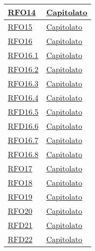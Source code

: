 \begin{longtable}{|>{\centering}m{5cm}|m{5cm}<{\centering}|}
\hyperlink{RFO14}{RFO14} & \hyperlink{Capitolato}{Capitolato}\\ \hline

\hyperlink{RFO15}{RFO15} & \hyperlink{Capitolato}{Capitolato}\\ \hline

\hyperlink{RFO16}{RFO16} & \hyperlink{Capitolato}{Capitolato}\\ \hline

\hyperlink{RFO16.1}{RFO16.1} & \hyperlink{Capitolato}{Capitolato}\\ \hline

\hyperlink{RFO16.2}{RFO16.2} & \hyperlink{Capitolato}{Capitolato}\\ \hline

\hyperlink{RFO16.3}{RFO16.3} & \hyperlink{Capitolato}{Capitolato}\\ \hline

\hyperlink{RFO16.4}{RFO16.4} & \hyperlink{Capitolato}{Capitolato}\\ \hline

\hyperlink{RFD16.5}{RFD16.5} & \hyperlink{Capitolato}{Capitolato}\\ \hline

\hyperlink{RFD16.6}{RFD16.6} & \hyperlink{Capitolato}{Capitolato}\\ \hline

\hyperlink{RFO16.7}{RFO16.7} & \hyperlink{Capitolato}{Capitolato}\\ \hline

\hyperlink{RFO16.8}{RFO16.8} & \hyperlink{Capitolato}{Capitolato}\\ \hline

\hyperlink{RFO17}{RFO17} & \hyperlink{Capitolato}{Capitolato}\\ \hline

\hyperlink{RFO18}{RFO18} & \hyperlink{Capitolato}{Capitolato}\\ \hline

\hyperlink{RFO19}{RFO19} & \hyperlink{Capitolato}{Capitolato}\\ \hline

\hyperlink{RFO20}{RFO20} & \hyperlink{Capitolato}{Capitolato}\\ \hline

\hyperlink{RFD21}{RFD21} & \hyperlink{Capitolato}{Capitolato}\\ \hline

\hyperlink{RFD22}{RFD22} & \hyperlink{Capitolato}{Capitolato}\\ \hline


\end{longtable}
